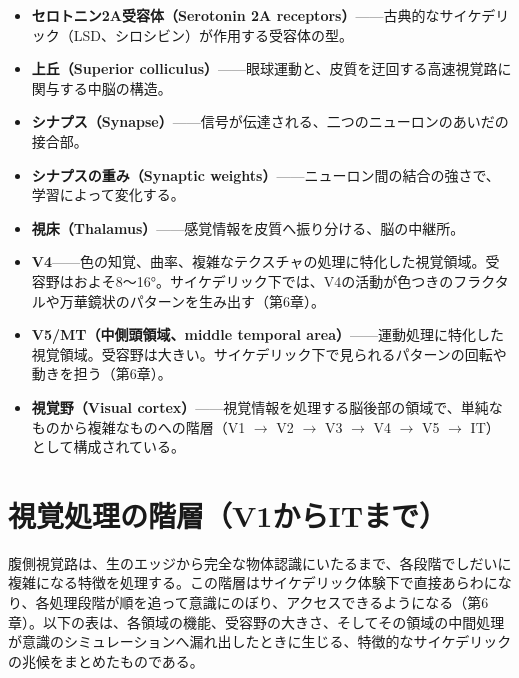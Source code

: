 \documentclass[11pt, twoside, openright]{book}
\begin{document}
\begin{itemize}
  \item \textbf{セロトニン2A受容体（Serotonin 2A receptors）}------古典的なサイケデリック（LSD、シロシビン）が作用する受容体の型。
  \item \textbf{上丘（Superior colliculus）}------眼球運動と、皮質を迂回する高速視覚路に関与する中脳の構造。
  \item \textbf{シナプス（Synapse）}------信号が伝達される、二つのニューロンのあいだの接合部。
  \item \textbf{シナプスの重み（Synaptic weights）}------ニューロン間の結合の強さで、学習によって変化する。
  \item \textbf{視床（Thalamus）}------感覚情報を皮質へ振り分ける、脳の中継所。
  \item \textbf{V4}------色の知覚、曲率、複雑なテクスチャの処理に特化した視覚領域。受容野はおよそ8〜16°。サイケデリック下では、V4の活動が色つきのフラクタルや万華鏡状のパターンを生み出す（第6章）。
  \item \textbf{V5/MT（中側頭領域、middle temporal area）}------運動処理に特化した視覚領域。受容野は大きい。サイケデリック下で見られるパターンの回転や動きを担う（第6章）。
  \item \textbf{視覚野（Visual cortex）}------視覚情報を処理する脳後部の領域で、単純なものから複雑なものへの階層（V1 $\rightarrow$ V2 $\rightarrow$ V3 $\rightarrow$ V4 $\rightarrow$ V5 $\rightarrow$ IT）として構成されている。
\end{itemize}

\section*{視覚処理の階層（V1からITまで）}

腹側視覚路は、生のエッジから完全な物体認識にいたるまで、各段階でしだいに複雑になる特徴を処理する。この階層はサイケデリック体験下で直接あらわになり、各処理段階が順を追って意識にのぼり、アクセスできるようになる（第6章）。以下の表は、各領域の機能、受容野の大きさ、そしてその領域の中間処理が意識のシミュレーションへ漏れ出したときに生じる、特徴的なサイケデリックの兆候をまとめたものである。
\end{document}
